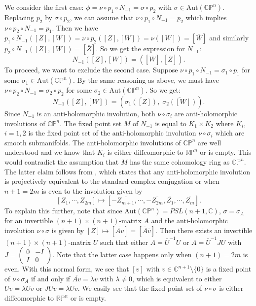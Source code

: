 \documentclass[a4paper, 12pt]{article}
\newcommand{\bC}{\mathbb{C}}
\newcommand{\bCP}{\mathbb{CP}^n}
\begin{document}
We consider the first case: $\phi=\nu\circ p_1\circ N_{-1}=\sigma\circ p_2$ with $\sigma\in \mathrm{Aut}(\bCP)$. Replacing $p_2$
by $\sigma\circ p_2$, we can assume that $\nu\circ p_1\circ N_{-1}=p_2$ which implies
$\nu\circ p_2 \circ N_{-1}=p_1$.
Then we have $
p_1\circ N_{-1}([Z],[W])=\nu \circ p_2([Z], [W])=\nu([W])=[\overline{W}]
$
and similarly $p_2\circ N_{-1}([Z],[W])=[\overline{Z}]$. So we get the expression for $N_{-1}$:
\begin{equation*}
    N_{-1}([Z], [W])=([\overline{W}], [\overline{Z}]). 
\end{equation*}
To proceed, we want to exclude the second case. Suppose $\nu\circ p_1\circ N_{-1}=\sigma_1\circ p_1$ for some $\sigma_1\in \mathrm{Aut}(\bCP)$. By the same reasoning as above, we must have $\nu\circ p_2\circ N_{-1}=\sigma_2\circ p_2$ for some $\sigma_2\in \mathrm{Aut}(\bCP)$. So we get:
\begin{equation*}
N_{-1}([Z], [W])=(\overline{\sigma_1([Z])},\; \overline{\sigma_2([W])}).
\end{equation*}
Since $N_{-1}$ is an anti-holomorphic involution,
both $\nu \circ \sigma_i$ are anti-holomorphic involutions of $\bCP$.
The fixed point set $M$ of $N_{-1}$ is equal to 
$K_1\times K_2$ where $K_i$, $i=1,2 $ is the fixed point set of the anti-holomorphic involution $\nu\circ \sigma_i$ which are smooth submanifolds. 
The anti-holomorphic involutions of $\bCP$ are well understood and we know that $K_i$ is either diffeomorphic to $\mathbb{R}\mathbb{P}^n$ or is empty. This would contradict the assumption that $M$ has the same cohomology ring as $\bCP$. 
The latter claim follows from \cite[Lemma 5.29]{SK22}, which states that any anti-holomorphic involution is projectively equivalent to the standard complex conjugation or when $n+1=2m$ is even to the involution given by 
$$
[Z_1,\cdots, Z_{2m}]\mapsto [-\overline{Z_{m+1}}, \cdots, -\overline{Z_{2m}}, \overline{Z_1},\cdots, \overline{Z_m}].
$$
To explain this further, note that since $\mathrm{Aut}(\bCP)=PSL(n+1, \bC)$,  $\sigma=\sigma_A$ for an invertible $(n+1)\times (n+1)$-matrix $A$ and the anti-holomorphic involution $\nu\circ \sigma$ is given by $[Z]\mapsto [\overline{A v}]=[\bar{A}\bar{v}]$. 
Then there exists an invertible $(n+1)\times (n+1)$-matrix $U$ such that either $A=\bar{U}^{-1}{U}$ or $A=\bar{U}^{-1}J{U}$ with $J=\left(\begin{array}{cc}0&-I\\I&0\end{array}\right)$. Note that the latter case happens only when $(n+1)=2m$ is even. 
With this normal form, we see that $[v]$ with $v\in \bC^{n+1}\setminus \{0\}$ is a fixed point of $\nu\circ \sigma_A$ if and only if 
$\overline{Av}=\lambda v$ with $\lambda \neq 0$, which is equivalent to either 
$U v=\bar{\lambda} \overline{Uv}$ or $J U v=\bar{\lambda} \overline{U v}$. We easily see that the fixed point set of $\nu\circ\sigma$ is either diffeomorphic to $\mathbb{R}\mathbb{P}^n$ or is empty. 
\end{document}
